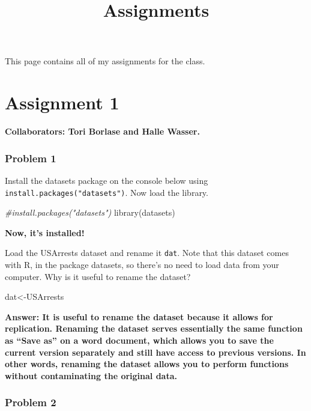 \documentclass[
]{article}
\title{Assignments}
\author{}
\date{\vspace{-2.5em}}
\newenvironment{Shaded}{\begin{snugshade}}{\end{snugshade}}
\newcommand{\CommentTok}[1]{\textcolor[rgb]{0.56,0.35,0.01}{\textit{#1}}}
\newcommand{\FunctionTok}[1]{\textcolor[rgb]{0.00,0.00,0.00}{#1}}
\newcommand{\NormalTok}[1]{#1}
\newcommand{\OtherTok}[1]{\textcolor[rgb]{0.56,0.35,0.01}{#1}}
\begin{document}
\maketitle

{
\setcounter{tocdepth}{1}
\tableofcontents
}
This page contains all of my assignments for the class.

\hypertarget{assignment-1}{%
\section{Assignment 1}\label{assignment-1}}

\textbf{Collaborators: Tori Borlase and Halle Wasser. }

\hypertarget{problem-1}{%
\subsubsection{Problem 1}\label{problem-1}}

Install the datasets package on the console below using
\texttt{install.packages("datasets")}. Now load the library.

\begin{Shaded}
\begin{Highlighting}[]
\CommentTok{\#install.packages("datasets")}
\FunctionTok{library}\NormalTok{(datasets)}
\end{Highlighting}
\end{Shaded}

\textbf{Now, it's installed!}

Load the USArrests dataset and rename it \texttt{dat}. Note that this
dataset comes with R, in the package datasets, so there's no need to
load data from your computer. Why is it useful to rename the dataset?

\begin{Shaded}
\begin{Highlighting}[]
\NormalTok{dat}\OtherTok{\textless{}{-}}\NormalTok{USArrests}
\end{Highlighting}
\end{Shaded}

\textbf{Answer: It is useful to rename the dataset because it allows for
replication. Renaming the dataset serves essentially the same function
as ``Save as'' on a word document, which allows you to save the current
version separately and still have access to previous versions. In other
words, renaming the dataset allows you to perform functions without
contaminating the original data.}

\hypertarget{problem-2}{%
\subsubsection{Problem 2}\label{problem-2}}
\end{document}
